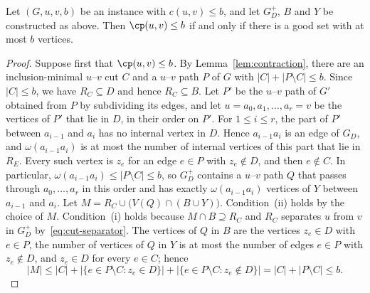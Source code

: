 \begin{lemma}
\label{lem:good-set}
Let $(G, u, v, b)$ be an instance with $c(u,v) \leq b$, and let $G_D^+$, $B$ and $Y$ be constructed as above.
Then $\cp(u,v) \leq b$ if and only if there is a good set with at most $b$ vertices.
\end{lemma}

\begin{proof}
Suppose first that $\cp(u,v) \leq b$.
By Lemma~\ref{lem:contraction}, there are an inclusion-minimal $u$--$v$ cut $C$ and a $u$--$v$ path $P$ of $G$ with $|C| + |P \setminus C| \leq b$.
Since $|C| \leq b$, we have $R_C \subseteq D$ and hence $R_C \subseteq B$.
Let $P'$ be the $u$--$v$ path of $G'$ obtained from $P$ by subdividing its edges, and let $u = a_0, a_1, \dots, a_r = v$ be the vertices of $P'$ that lie in $D$, in their order on $P'$.
For $1 \leq i \leq r$, the part of $P'$ between $a_{i-1}$ and $a_i$ has no internal vertex in $D$.
Hence $a_{i-1}a_i$ is an edge of $G_D$, and $\omega(a_{i-1}a_i)$ is at most the number of internal vertices of this part that lie in $R_E$.
Every such vertex is $z_e$ for an edge $e \in P$ with $z_e \notin D$, and then $e \notin C$.
In particular, $\omega(a_{i-1}a_i) \leq |P \setminus C| \leq b$, so $G_D^+$ contains a $u$--$v$ path $Q$ that passes through $a_0, \dots, a_r$ in this order and has exactly $\omega(a_{i-1}a_i)$ vertices of $Y$ between $a_{i-1}$ and $a_i$.
Let $M = R_C \cup \bigl(V(Q) \cap (B \cup Y)\bigr)$.
Condition~(ii) holds by the choice of $M$.
Condition~(i) holds because $M \cap B \supseteq R_C$ and $R_C$ separates $u$ from $v$ in $G_D^+$ by~\eqref{eq:cut-separator}.
The vertices of $Q$ in $B$ are the vertices $z_e \in D$ with $e \in P$, the number of vertices of $Q$ in $Y$ is at most the number of edges $e \in P$ with $z_e \notin D$, and $z_e \in D$ for every $e \in C$; hence
\[
|M| \leq |C| + |\{e \in P \setminus C : z_e \in D\}| + |\{e \in P \setminus C : z_e \notin D\}| = |C| + |P \setminus C| \leq b.
\]


\end{proof}
